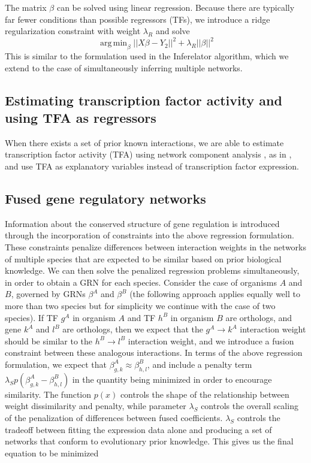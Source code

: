 \documentclass[11pt]{article}
\DeclareMathOperator*{\argmin}{arg\,min}
\begin{document}
\noindent The matrix $\beta$ can be solved using linear regression. Because there are typically far fewer conditions than possible regressors (TFs), we introduce a ridge regularization constraint with weight $\lambda_R$ and solve
\begin{equation}
\argmin_\beta\vert \vert X\beta - Y_2 \vert \vert ^2 + \lambda_R \vert \vert \beta \vert \vert ^2
\end{equation}
This is similar to the formulation used in the Inferelator algorithm, which we extend to the case of simultaneously inferring multiple networks. 
\subsection{Estimating transcription factor activity and using TFA as regressors}
When there exists a set of prior known interactions, we are able to estimate transcription factor activity (TFA) using network component analysis \cite{liao2003network}, as in \cite{arrieta-ortiz_experimentally_2015, fu_reconstructing_2011}, and use TFA as explanatory variables instead of transcription factor expression. 

\subsection{Fused gene regulatory networks}

Information about the conserved structure of gene regulation is introduced through the incorporation of constraints into the above regression formulation. These constraints penalize differences between interaction weights in the networks of multiple species that are expected to be similar based on prior biological knowledge. We can then solve the penalized regression problems simultaneously, in order to obtain a GRN for each species. Consider the case of organisms $A$ and $B$, governed by GRNs $\beta^A$ and $\beta^B$ (the following approach applies equally well to more than two species but for simplicity we continue with the case of two species). If TF $g^A$ in organism $A$ and TF $h^B$ in organism $B$ are orthologs, and gene $k^A$ and $l^B$ are orthologs, then we expect that the $g^A \rightarrow k^A$ interaction weight should be similar to the $h^B \rightarrow l^B$ interaction weight, and we introduce a fusion constraint between these analogous interactions. In terms of the above regression formulation, we expect that $\beta^A_{g,k} \approx \beta^B_{h,l}$, and include a penalty term $\lambda_Sp(\beta^A_{g,k} - \beta^B_{h,l})$ in the quantity being minimized in order to encourage similarity. The function $p(x)$ controls the shape of the relationship between weight dissimilarity and penalty, while parameter $\lambda_S$ controls the overall scaling of the penalization of differences between fused coefficients. $\lambda_S$ controls the tradeoff between fitting the expression data alone and producing a set of networks that conform to evolutionary prior knowledge. This gives us the final equation to be minimized 
\end{document}
